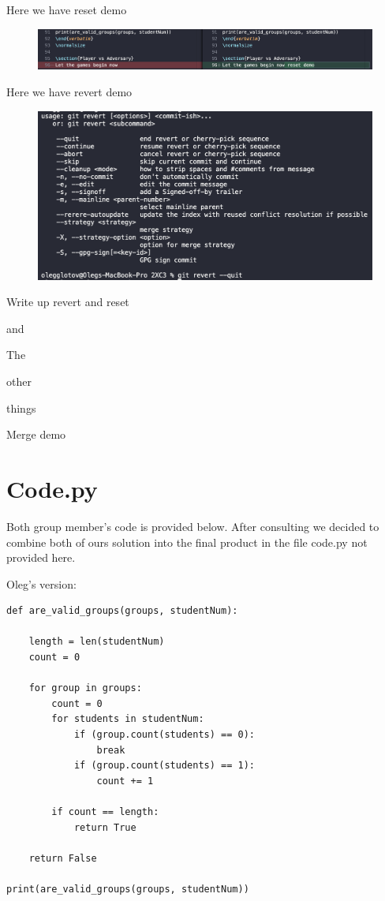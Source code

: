 \documentclass[twocolumn, 10pt]{article}
\begin{document}
Here we have reset demo

\begin{figure}[H]
\includegraphics[width=\linewidth]{reset}
\end{figure}

Here we have revert demo

\begin{figure}[H]
\includegraphics[width=\linewidth]{revert}
\end{figure}

Write up revert and reset

and

The

other 

things

Merge demo

\section{Code.py}

Both group member's code is provided below. After consulting we decided to combine both of ours solution into the final product in the file code.py not provided here.

Oleg's version:

\footnotesize
\begin{verbatim}
def are_valid_groups(groups, studentNum):

    length = len(studentNum)
    count = 0
    
    for group in groups:
        count = 0
        for students in studentNum:
            if (group.count(students) == 0):
                break
            if (group.count(students) == 1):
                count += 1
        
        if count == length:
            return True
        
    return False

print(are_valid_groups(groups, studentNum))
\end{verbatim}
\normalsize
\end{document}

